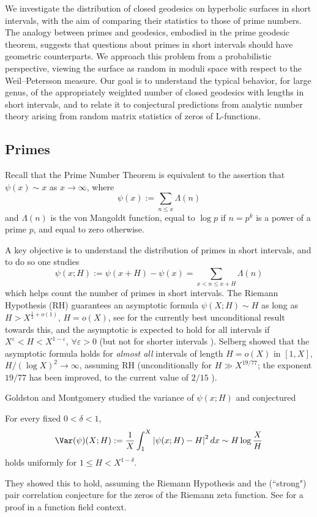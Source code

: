 \documentclass[12pt]{amsart}
\begin{document}
 We investigate the distribution of closed geodesics on hyperbolic surfaces in short intervals, with the aim of comparing their statistics to those of prime numbers. The analogy between primes and geodesics, embodied in the prime geodesic theorem, suggests that questions about primes in short intervals should have geometric counterparts. We approach this problem from a probabilistic perspective, viewing the surface as random in moduli space with respect to the Weil–Petersson measure. Our goal is to understand the typical behavior, for large genus, of the appropriately weighted number of closed geodesics with lengths in short intervals, and to relate it to conjectural predictions from analytic number theory arising from random matrix statistics of zeros of L-functions.

\subsection{Primes} 
Recall that the Prime Number Theorem is equivalent to the assertion that $\psi(x)\sim x$ as $x\to \infty$, where 
\[
\psi(x):=\sum_{n\leq x} \Lambda(n)
\]
and  $\Lambda(n)$ is the von Mangoldt function, equal to $\log p$ if $n=p^k$ is a power of a prime $p$, and equal to zero otherwise. 


A key objective is to understand the distribution of primes in short intervals, and to do so one studies
\[
\psi(x;H):=\psi(x+H)-\psi(x)=\sum_{x<n\leq x+H} \Lambda(n)
\]
which helps count the number of primes in short intervals.  The Riemann Hypothesis (RH) guarantees an asymptotic formula
$\psi(X;H)\sim H$ as long as $H>X^{\frac 12 +o(1)}$, $H=o(X)$, see \cite{GuthMaynard} for the currently best unconditional result towards this, and the asymptotic is expected to hold for all intervals if $X^\varepsilon<H<X^{1-\varepsilon}$, $\forall \varepsilon>0$ (but not for shorter intervals \cite{Maier}).  
Selberg   \cite{Selberg} showed that the asymptotic formula holds for {\em almost all}  intervals of length $H=o(X)$ in $[1,X]$,  $H/(\log X)^2\to \infty$, assuming RH    (unconditionally for $H\gg X^{19/77}$; the exponent $19/77$ has been improved, to the current value of $2/15$ \cite{GuthMaynard}).  


Goldston and Montgomery
\cite{GM} studied the variance of $\psi(x;H)$ and conjectured 
\begin{conj}\label{GM conjecture}
For every fixed $0<\delta<1$, 
\begin{equation*}%
\Var(\psi)(X;H):=\frac 1X\int_1^X \left|\psi(x;H)- H\right|^2 dx \sim H \log \frac XH 
\end{equation*}
holds uniformly for $1\leq H<X^{1-\delta}$.
\end{conj}
They showed this to hold, assuming the Riemann Hypothesis and  the (``strong") pair correlation conjecture for the zeros of the Riemann zeta function.   See \cite{KeatingRudnick, HKR} for a proof in a function field context. 
\end{document}
